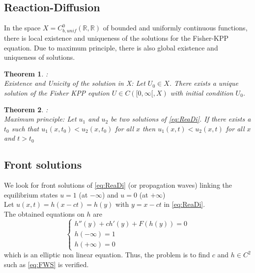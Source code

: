 \documentclass[17pt]{extarticle}
\begin{document}
\subsection{Reaction-Diffusion}
In the space $X=C^0_{b,unif}(\mathbb{R},\mathbb{R})$ of bounded and uniformly continuous functions, there is local existence and uniqueness of the solutions for the Fisher-KPP equation. Due to maximum principle, there is also global existence and uniqueness of solutions.
\newtheorem{theorem}{Theorem}
\begin{theorem}:\\ Existence and Unicity of the solution in X: Let $U_0 \in X$. There exists a unique solution of the Fisher KPP eqution $U \in C([0,\infty[,X)$ with initial condition $U_0$. \end{theorem}
\begin{theorem}:\\ Maximum principle: Let $u_1$ and $u_2$ be two solutions of \eqref{eq:ReaDi}. If there exists a $t_0$ such that $u_1(x,t_0)<u_2(x,t_0)$ for all $x$ then $u_1(x,t)<u_2(x,t)$ for all $x$ and $t>t_0$ \end{theorem}

\subsection{Front solutions}
We look for front solutions of \eqref{eq:ReaDi} (or propagation waves) linking the equilibrium states $u=1$ (at $-\infty$) and $u=0$ (at $+\infty$)\\
Let $u(x,t) = h(x-ct)=h(y)$  with $y=x-ct$ in \eqref{eq:ReaDi}. \\
The obtained equations on $h$ are \begin{equation} \label{eq:FWS} \left\{
                \begin{array}{ll}
                h''(y)+ ch'(y)+F(h(y))=0 \\
                h(-\infty)= 1 \\  h(+\infty) =0 
                   \end{array}
              \right.
\end{equation} 
which is an elliptic non linear equation. Thus, the problem is to find $c$ and $h \in C^2$ such as \eqref{eq:FWS} is verified.



\newpage
\end{document}
